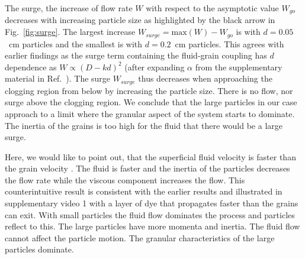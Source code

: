 \documentclass[twoside,twocolumn,9pt]{article}
\begin{document}
The surge, the increase of flow rate $W$ with respect to the asymptotic value 
$W_{go}$ decreases with increasing particle size as highlighted by the black arrow in Fig.~\ref{fig:surge}. 
The largest increase $W_{surge} = \mathrm{max}(W) - W_{go}$ is with 
$d=0.05$~cm particles and the smallest is with $d=0.2$~cm particles. 
This agrees with earlier findings as the surge term 
containing the fluid-grain coupling has $d$ dependence as $W\propto(D-kd)^2$ 
(after expanding $\alpha$ from the supplementary material in 
Ref.~\cite{koivistoSubmitted}). 
The surge $W_{surge}$ thus decreases when approaching the clogging region 
from below by increasing the particle size. 
There is no flow, nor surge above the clogging region. 
We conclude that the large particles in our case approach to a limit where 
the granular aspect of the system starts to dominate. 
The inertia of the grains is too high for the fluid that there would be a 
large surge. 
%






Here, we would like to point out, that the superficial fluid velocity is faster than the grain velocity \cite{koivistoSubmitted}.
The fluid is faster and the inertia of the particles decreases the flow rate while the viscous component increases the flow.
This counterintuitive result is consistent with the earlier results 
\cite{koivistoSubmitted} and illustrated in supplementary video 1 with a 
layer of dye that propagates faster than the grains can exit. 
With small particles the fluid flow dominates the process and particles reflect to this.
The large particles have more momenta and inertia.
The fluid flow cannot affect the particle motion.
The granular characteristics of the large particles dominate.
\end{document}
